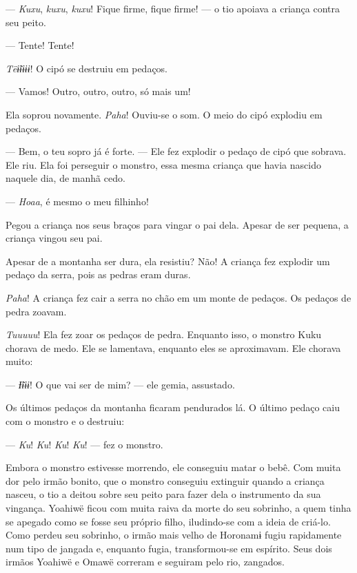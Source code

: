 --- \textit{Kuxu}, \textit{kuxu}, \textit{kuxu}! Fique firme, fique firme! --- o tio apoiava a
criança contra seu peito. 

--- Tente! Tente! 

   

\textit{Tëɨ̃ɨɨɨɨ}! O cipó se destruiu em pedaços. 

--- Vamos! Outro, outro, outro, só mais um!

Ela soprou novamente. \textit{Paha}! Ouviu-se o som. O meio do cipó explodiu em pedaços. 

--- Bem, o teu sopro já é forte. --- Ele fez explodir o pedaço de cipó
que sobrava. Ele riu. Ela foi perseguir o monstro, essa mesma criança
que havia nascido naquele dia, de manhã cedo. 

--- \textit{Hoaa}, é mesmo o meu filhinho! 

Pegou a criança nos seus braços para vingar o pai dela. Apesar de ser
pequena, a criança vingou seu pai. 

Apesar de a montanha ser dura, ela resistiu? Não! A criança fez explodir um
pedaço da serra, pois as pedras eram duras. 

\textit{Paha}! A criança fez cair a serra no chão em um monte de pedaços. Os
pedaços de pedra zoavam.

\textit{Tuuuuu}! Ela fez zoar os pedaços de pedra. Enquanto isso, o monstro Kuku
chorava de medo. Ele se lamentava, enquanto eles se aproximavam. Ele
chorava muito:

--- \textit{Ɨ̃ɨɨɨ}! O que vai ser de mim? --- ele gemia, assustado. 

Os últimos pedaços da montanha ficaram pendurados lá. O último pedaço
caiu com o monstro e o destruiu: 

--- \textit{Ku}! \textit{Ku}! \textit{Ku}! \textit{Ku}! --- fez o monstro. 

Embora o monstro estivesse morrendo, ele conseguiu matar o bebê. Com
muita dor pelo irmão bonito, que o monstro conseguiu extinguir quando a
criança nasceu, o tio a deitou sobre seu peito para fazer dela o
instrumento da sua vingança. Yoahiwë ficou com muita raiva da morte do
seu sobrinho, a quem tinha se apegado como se fosse seu próprio filho,
iludindo-se com a ideia de criá-lo. Como perdeu seu sobrinho, o irmão
mais velho de Horonamɨ fugiu rapidamente num tipo de jangada e, enquanto
fugia, transformou-se em espírito. Seus dois irmãos Yoahiwë e Omawë correram e seguiram pelo rio, zangados. 

